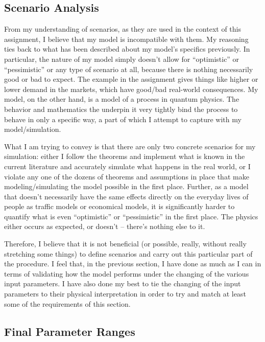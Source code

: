 \subsection{Scenario Analysis}

From my understanding of scenarios, as they are used in the context of this assignment, I believe that my model is incompatible with them. My reasoning ties back to what has been described about my model's specifics previously. In particular, the nature of my model simply doesn't allow for ``optimistic'' or ``pessimistic'' or any type of scenario at all, because there is nothing necessarily good or bad to expect. The example in the assignment gives things like higher or lower demand in the markets, which have good/bad real-world consequences. My model, on the other hand, is a model of a process in quantum physics. The behavior and mathematics the underpin it very tightly bind the process to behave in only a specific way, a part of which I attempt to capture with my model/simulation.

What I am trying to convey is that there are only two concrete scenarios for my simulation: either I follow the theorems and implement what is known in the current literature and accurately simulate what happens in the real world, or I violate any one of the dozens of theorems and assumptions in place that make modeling/simulating the model possible in the first place. Further, as a model that doesn't necessarily have the same effects directly on the everyday lives of people as traffic models or economical models, it is significantly harder to quantify what is even ``optimistic'' or ``pessimistic'' in the first place. The physics either occurs as expected, or doesn't -- there's nothing else to it.

Therefore, I believe that it is not beneficial (or possible, really, without really stretching some things) to define scenarios and carry out this particular part of the procedure. I feel that, in the previous section, I have done as much as I can in terms of validating how the model performs under the changing of the various input parameters. I have also done my best to tie the changing of the input parameters to their physical interpretation in order to try and match at least some of the requirements of this section.


\subsection{Final Parameter Ranges}

